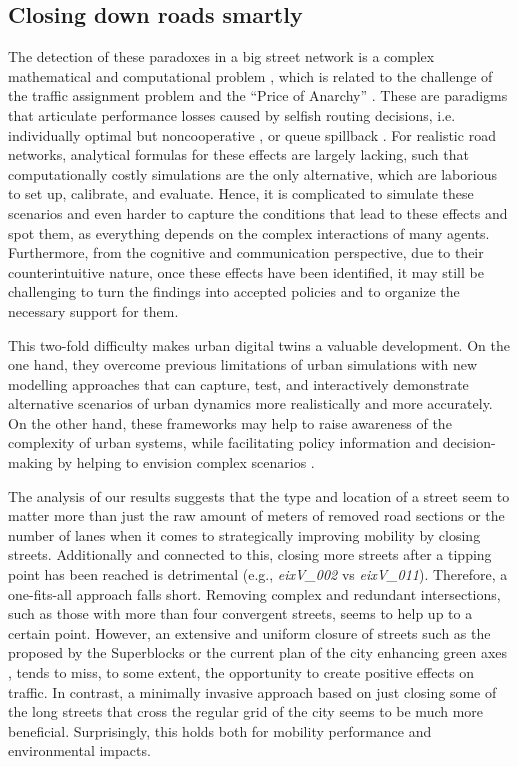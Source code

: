 \subsection{Closing down roads smartly}
\label{subsec:LCBM_4.2_close_smart}

The detection of these paradoxes in a big street network is a complex mathematical and computational problem \citep{Bagloee2019}, which is related to the challenge of the traffic assignment problem \citep{Beckmann1956} and the “Price of Anarchy” \citep{Roughgarden2005}. These are paradigms that articulate performance losses caused by selfish routing decisions, i.e. individually optimal but noncooperative \citep{Roughgarden2005}, or queue spillback \citep{Daganzo1998}. For realistic road networks, analytical formulas for these effects are largely lacking, such that computationally costly simulations are the only alternative, which are laborious to set up, calibrate, and evaluate. Hence, it is complicated to simulate these scenarios and even harder to capture the conditions that lead to these effects and spot them, as everything depends on the complex interactions of many agents. Furthermore, from the cognitive and communication perspective, due to their counterintuitive nature, once these effects have been identified, it may still be challenging to turn the findings into accepted policies and to organize the necessary support for them. 

This two-fold difficulty makes urban digital twins a valuable development. On the one hand, they overcome previous limitations of urban simulations with new modelling approaches that can capture, test, and interactively demonstrate alternative scenarios of urban dynamics more realistically and more accurately. On the other hand, these frameworks may help to raise awareness of the complexity of urban systems, while facilitating policy information and decision-making by helping to envision complex scenarios \citep{Borning2008,Bettencourt2019}.

The analysis of our results suggests that the type and location of a street seem to matter more than just the raw amount of meters of removed road sections or the number of lanes when it comes to strategically improving mobility by closing streets. Additionally and connected to this, closing more streets after a tipping point has been reached is detrimental (e.g., \emph{eixV\_002} vs \emph{eixV\_011}). Therefore, a one-fits-all approach falls short. Removing complex and redundant intersections, such as those with more than four convergent streets, seems to help up to a certain point. However, an extensive and uniform closure of streets such as the proposed by the Superblocks \citep{Rueda2018} or the current plan of the city enhancing green axes \citep{AjuntamentdeBarcelona2021c}, tends to miss, to some extent, the opportunity to create positive effects on traffic. In contrast, a minimally invasive approach based on just closing some of the long streets that cross the regular grid of the city seems to be much more beneficial. Surprisingly, this holds both for mobility performance and environmental impacts.  

